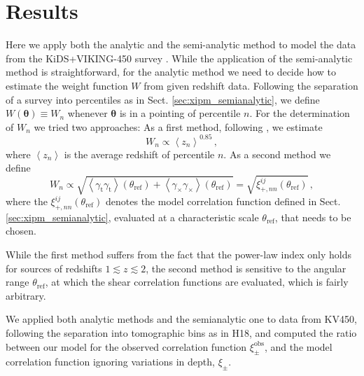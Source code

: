 \documentclass[referee]{aa} %
\renewcommand{\[}{\begin{equation}}
\renewcommand{\]}{\end{equation}}
\renewcommand{\rm}{\mathrm}
\def\b#1{\bm{#1}}
\def\la{\left<}
\def\ra{\right>}
\begin{document}

\section{Results}
\label{sec:results}
Here we apply both the analytic and the semi-analytic method to model the data from the KiDS+VIKING-450 survey \citep[KV450,][]{Wright:2018}. While the application of the semi-analytic method is straightforward, for the analytic method we need to decide how to estimate the weight function $W$ from given redshift data. Following the separation of a survey into percentiles as in Sect. \ref{sec:xipm_semianalytic}, we define $W(\b\theta)\equiv W_n$ whenever $\b\theta$ is in a pointing of percentile $n$. For the determination of $W_n$ we tried two approaches:
 As a first method, following \citet{2006APh....26...91V,1997A&A...322....1B}, we estimate 
\[
W_n \propto \la z_n \ra ^{0.85}\, ,
\]
where $\la z_n\ra$ is the average redshift of percentile $n$. As a second method we define \[
W_n \propto \sqrt{ \la\gamma_{\rm{t}}\gamma_{\rm{t}}\ra (\theta_{\rm{ref}}) + \la \gamma_\times\gamma_\times\ra (\theta_{\rm{ref}})} = \sqrt{\xi_{+,nn}^{ij}(\theta_{\rm{ref}})}\, ,
\]
where the $\xi_{+,nn}^{ij}(\theta_{\rm{ref}})$ denotes the model correlation function defined in Sect. \ref{sec:xipm_semianalytic}, evaluated at a characteristic scale $\theta_{\rm{ref}}$, that needs to be chosen.

While the first method suffers from the fact that the power-law index only holds for sources of redshifts $1\lesssim z \lesssim 2$, the second method is sensitive to the angular range $\theta_{\rm{ref}}$, at which the shear correlation functions are evaluated, which is fairly arbitrary.

We applied both analytic methods and the semianalytic one to data from KV450, following the separation into tomographic bins as in H18, and computed the ratio between our model for the observed correlation function $\xi_{\pm}^{\rm{obs}}$, and the model correlation function ignoring variations in depth, $\xi_{\pm}$. 
\end{document}
